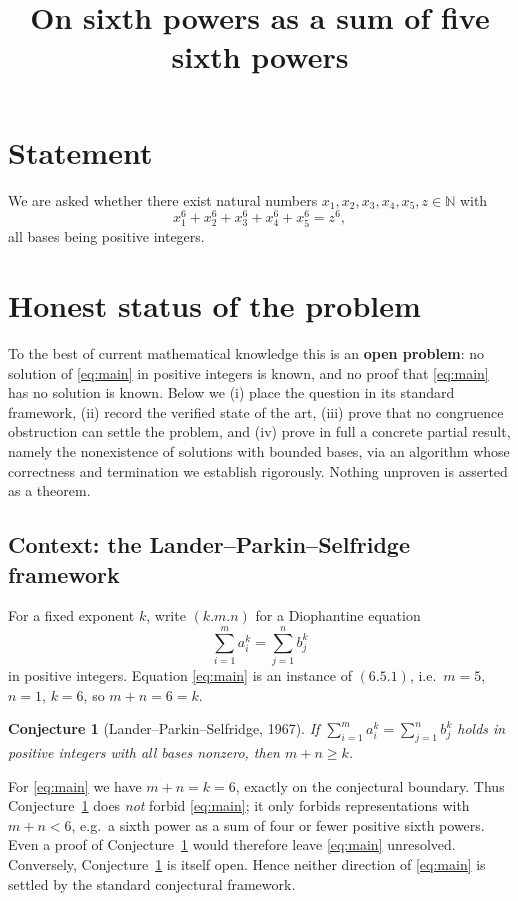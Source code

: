 \documentclass{amsart}
\newtheorem{conjecture}{Conjecture}
\begin{document}
\title{On sixth powers as a sum of five sixth powers}
\maketitle

\section*{Statement}
We are asked whether there exist natural numbers
$x_1,x_2,x_3,x_4,x_5,z\in\mathbb{N}$ with
\begin{equation}\label{eq:main}
x_1^6+x_2^6+x_3^6+x_4^6+x_5^6=z^6 ,
\end{equation}
all bases being positive integers.

\section*{Honest status of the problem}

To the best of current mathematical knowledge this is an
\textbf{open problem}: no solution of \eqref{eq:main} in positive
integers is known, and no proof that \eqref{eq:main} has no solution is
known. Below we (i) place the question in its standard framework,
(ii) record the verified state of the art, (iii) prove that no
congruence obstruction can settle the problem, and (iv) prove in full a
concrete partial result, namely the nonexistence of solutions with
bounded bases, via an algorithm whose correctness and termination we
establish rigorously. Nothing unproven is asserted as a theorem.

\subsection*{Context: the Lander--Parkin--Selfridge framework}
For a fixed exponent $k$, write $(k.m.n)$ for a Diophantine equation
$$\sum_{i=1}^{m}a_i^{k}=\sum_{j=1}^{n}b_j^{k}$$
in positive integers. Equation \eqref{eq:main} is an instance of
$(6.5.1)$, i.e.\ $m=5$, $n=1$, $k=6$, so $m+n=6=k$.

\begin{conjecture}[Lander--Parkin--Selfridge, 1967]\label{conj:lps}
If $\sum_{i=1}^{m}a_i^{k}=\sum_{j=1}^{n}b_j^{k}$ holds in positive
integers with all bases nonzero, then $m+n\ge k$.
\end{conjecture}

For \eqref{eq:main} we have $m+n=k=6$, exactly on the conjectural
boundary. Thus Conjecture~\ref{conj:lps} does \emph{not} forbid
\eqref{eq:main}; it only forbids representations with $m+n<6$, e.g.\ a
sixth power as a sum of four or fewer positive sixth powers. Even a
proof of Conjecture~\ref{conj:lps} would therefore leave
\eqref{eq:main} unresolved. Conversely, Conjecture~\ref{conj:lps} is
itself open. Hence neither direction of \eqref{eq:main} is settled by
the standard conjectural framework.
\end{document}
